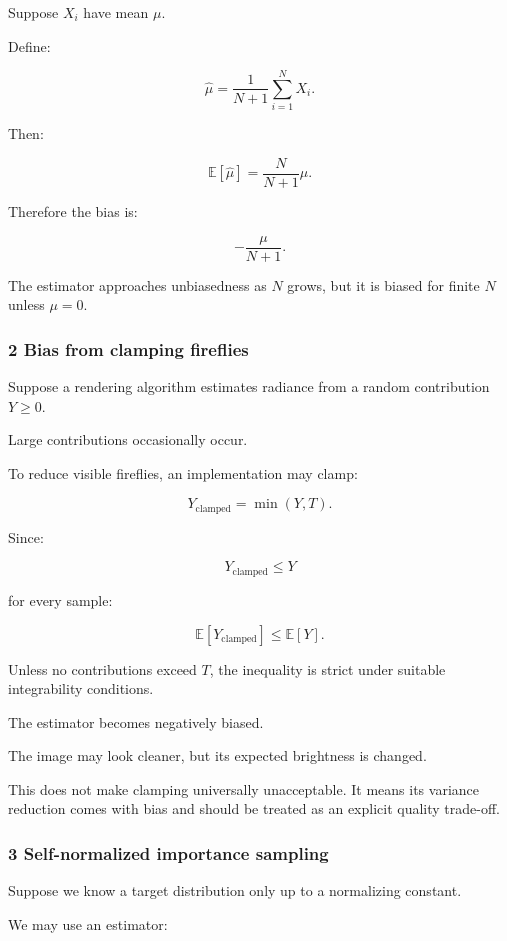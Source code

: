 Suppose \(X_i\) have mean \(\mu\).

Define:

\[
 \widehat\mu= \frac1{N+1}\sum_{i=1}^NX_i.
\]

Then:

\[
 \mathbb E[\widehat\mu] = \frac{N}{N+1}\mu.
\]

Therefore the bias is:

\[
 \boxed{ -\frac{\mu}{N+1} }.
\]

The estimator approaches unbiasedness as \(N\) grows, but it is biased for finite \(N\) unless \(\mu=0\).

\subsubsection{2 Bias from clamping fireflies}\label{02-foundations-ii-ch030-bias-from-clamping-fireflies}

Suppose a rendering algorithm estimates radiance from a random contribution \(Y\ge0\).

Large contributions occasionally occur.

To reduce visible fireflies, an implementation may clamp:

\[
 Y_{\mathrm{clamped}}=\min(Y,T).
\]

Since:

\[
 Y_{\mathrm{clamped}}\le Y
\]

for every sample:

\[
 \mathbb E[Y_{\mathrm{clamped}}] \le \mathbb E[Y].
\]

Unless no contributions exceed \(T\), the inequality is strict under suitable integrability conditions.

The estimator becomes negatively biased.

The image may look cleaner, but its expected brightness is changed.

This does not make clamping universally unacceptable. It means its variance reduction comes with bias and should be treated as an explicit quality trade-off.

\subsubsection{3 Self-normalized importance sampling}\label{02-foundations-ii-ch030-self-normalized-importance-sampling}

Suppose we know a target distribution only up to a normalizing constant.

We may use an estimator:

